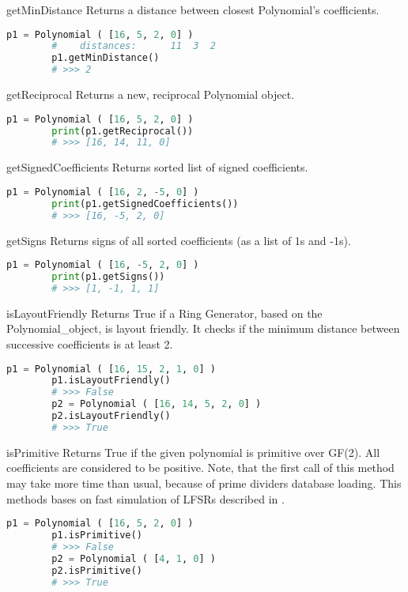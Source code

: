  {getMinDistance} {} {
	Returns a distance between closest Polynomial's coefficients.
}
\begin{lstlisting}[language=Python]
		p1 = Polynomial ( [16, 5, 2, 0] )
		#    distances:      11  3  2
		p1.getMinDistance()
		# >>> 2
\end{lstlisting}

 {getReciprocal} {} {
	Returns a new, reciprocal Polynomial object.
}
\begin{lstlisting}[language=Python]
		p1 = Polynomial ( [16, 5, 2, 0] )
		print(p1.getReciprocal())
		# >>> [16, 14, 11, 0]
\end{lstlisting}

 {getSignedCoefficients} {} {
	Returns sorted list of signed coefficients.
}
		\begin{lstlisting}[language=Python]
		p1 = Polynomial ( [16, 2, -5, 0] )
		print(p1.getSignedCoefficients())
		# >>> [16, -5, 2, 0]
\end{lstlisting}

 {getSigns} {} {
	Returns signs of all sorted coefficients (as a list of 1s and -1s).
}
\begin{lstlisting}[language=Python]
		p1 = Polynomial ( [16, -5, 2, 0] )
		print(p1.getSigns())
		# >>> [1, -1, 1, 1]
\end{lstlisting}

 {isLayoutFriendly} {} {
	Returns True if a Ring Generator, based on the Polynomial\_object, is layout friendly. It checks if the minimum distance between successive coefficients is at least 2.
}
\begin{lstlisting}[language=Python]
		p1 = Polynomial ( [16, 15, 2, 1, 0] )
		p1.isLayoutFriendly()
		# >>> False
		p2 = Polynomial ( [16, 14, 5, 2, 0] )
		p2.isLayoutFriendly()
		# >>> True
\end{lstlisting}

 {isPrimitive} {} {
	Returns True if the given polynomial is primitive over GF(2). All coefficients are considered to be positive. Note, that the first call of this method may take more time than usual, because of prime dividers database loading.
	This methods bases on fast simulation of LFSRs described in \cite{lfsr:fastsim}.
}
\begin{lstlisting}[language=Python]
		p1 = Polynomial ( [16, 5, 2, 0] )
		p1.isPrimitive()
		# >>> False
		p2 = Polynomial ( [4, 1, 0] )
		p2.isPrimitive()
		# >>> True
\end{lstlisting}

